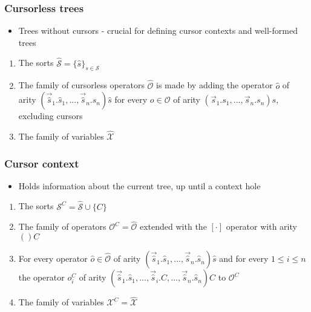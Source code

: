 \documentclass[t,24pt,aspectratio=169]{beamer}
\renewcommand{\vec}[1]{\overrightarrow{#1}}
\begin{document}
\begin{frame}
    \frametitle{Cursorless trees}
    \begin{itemize}
        \item Trees without cursors - crucial for defining cursor contexts and well-formed trees
    \end{itemize}
    \vspace{1cm}
    \begin{enumerate}
        \item The sorts $\hat{\mathcal{S}} = \{ \hat{s} \}_{s \in \mathcal{S}}$
        \item The family of cursorless operators $\hat{\mathcal{O}}$ is made by adding
              the operator $\hat{o}$ of arity
              $(\vec{\hat{s}}_1.\hat{s}_1,...,\vec{\hat{s}}_n.\hat{s}_n)\hat{s}$
              for every $o \in \mathcal{O}$ of arity $(\vec{s}_1.s_1,...,\vec{s}_n.s_n)s$, excluding cursors
        \item The family of variables $\hat{\mathcal{X}}$
    \end{enumerate}
\end{frame}

\begin{frame}
    \frametitle{Cursor context}
    \begin{itemize}
        \item Holds information about the current tree, up until a context hole
    \end{itemize}
    \vspace{1cm}
    \begin{enumerate}
        \item The sorts $\mathcal{S}^C = \hat{\mathcal{S}} \cup \{C\}$
        \item The family of operators $\mathcal{O}^C = \hat{\mathcal{O}}$ extended with the $[\cdot]$ operator with arity $()C$
        \item For every operator $\hat{o} \in \hat{\mathcal{O}}$ of arity $(\vec{\hat{s}}_1.\hat{s}_1,...,\vec{\hat{s}}_n.\hat{s}_n)\hat{s}$ and for every $1 \leq i \leq n$ the operator $o_i^C$ of arity $(\vec{\hat{s}}_1.\hat{s}_1,...,\vec{\hat{s}}_i.C,...,\vec{\hat{s}}_n.\hat{s}_n)C$ to $\mathcal{O}^C$
        \item The family of variables $\mathcal{X}^C = \hat{\mathcal{X}}$
    \end{enumerate}
\end{frame}
\end{document}
